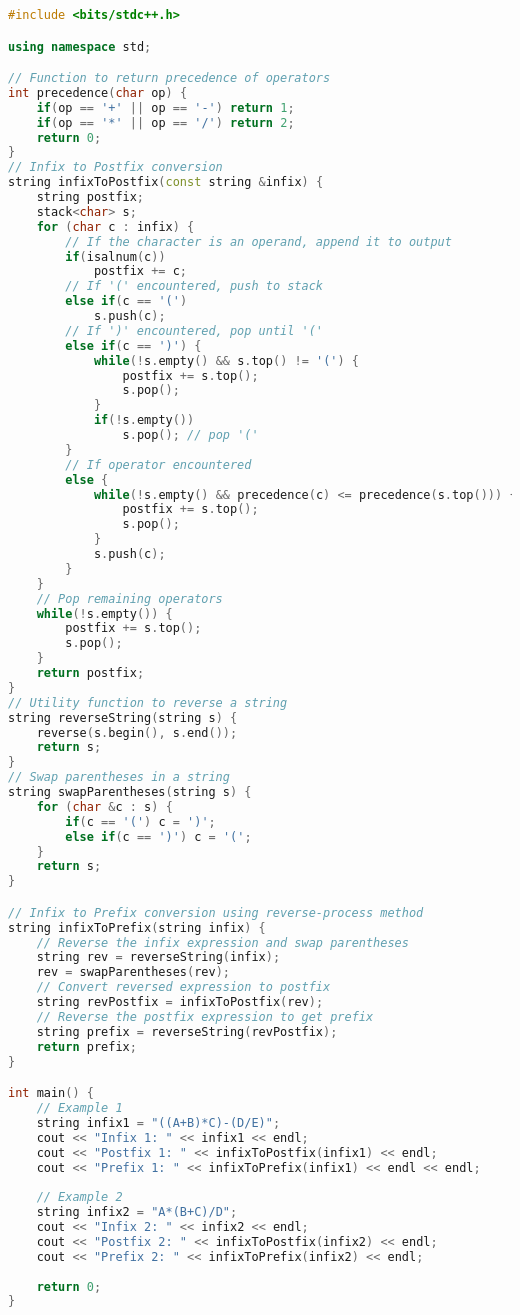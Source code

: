\begin{lstlisting}[language=C++, caption={Extended C++ Code for Infix, Postfix, and Prefix Conversion}]
#include <bits/stdc++.h>

using namespace std;

// Function to return precedence of operators
int precedence(char op) {
    if(op == '+' || op == '-') return 1;
    if(op == '*' || op == '/') return 2;
    return 0;
}
// Infix to Postfix conversion
string infixToPostfix(const string &infix) {
    string postfix;
    stack<char> s;
    for (char c : infix) {
        // If the character is an operand, append it to output
        if(isalnum(c))
            postfix += c;
        // If '(' encountered, push to stack
        else if(c == '(')
            s.push(c);
        // If ')' encountered, pop until '('
        else if(c == ')') {
            while(!s.empty() && s.top() != '(') {
                postfix += s.top();
                s.pop();
            }
            if(!s.empty())
                s.pop(); // pop '('
        }
        // If operator encountered
        else {
            while(!s.empty() && precedence(c) <= precedence(s.top())) {
                postfix += s.top();
                s.pop();
            }
            s.push(c);
        }
    }
    // Pop remaining operators
    while(!s.empty()) {
        postfix += s.top();
        s.pop();
    }
    return postfix;
}
// Utility function to reverse a string
string reverseString(string s) {
    reverse(s.begin(), s.end());
    return s;
}
// Swap parentheses in a string
string swapParentheses(string s) {
    for (char &c : s) {
        if(c == '(') c = ')';
        else if(c == ')') c = '(';
    }
    return s;
}

// Infix to Prefix conversion using reverse-process method
string infixToPrefix(string infix) {
    // Reverse the infix expression and swap parentheses
    string rev = reverseString(infix);
    rev = swapParentheses(rev);
    // Convert reversed expression to postfix
    string revPostfix = infixToPostfix(rev);
    // Reverse the postfix expression to get prefix
    string prefix = reverseString(revPostfix);
    return prefix;
}

int main() {
    // Example 1
    string infix1 = "((A+B)*C)-(D/E)";
    cout << "Infix 1: " << infix1 << endl;
    cout << "Postfix 1: " << infixToPostfix(infix1) << endl;
    cout << "Prefix 1: " << infixToPrefix(infix1) << endl << endl;
    
    // Example 2
    string infix2 = "A*(B+C)/D";
    cout << "Infix 2: " << infix2 << endl;
    cout << "Postfix 2: " << infixToPostfix(infix2) << endl;
    cout << "Prefix 2: " << infixToPrefix(infix2) << endl;
    
    return 0;
}
\end{lstlisting}

